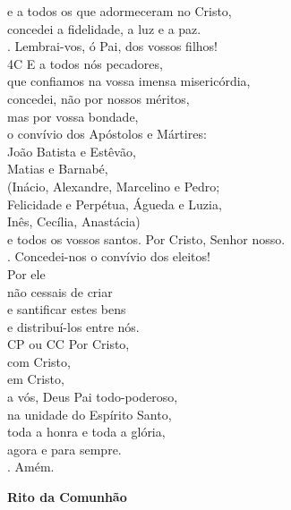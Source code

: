 \documentclass{book}
\begin{document}
\begin{flushleft}
    e a todos os que adormeceram no Cristo, \\
    concedei a fidelidade, a luz e a paz.
    \vspace{.1cm} \\
    {\color{red} \Rbar.} Lembrai-vos, ó Pai, dos vossos filhos!
    \vspace{.1cm} \\
    {\color{red}4C} E a todos nós pecadores, \\
    que confiamos na vossa imensa misericórdia, \\
    concedei, não por nossos méritos, \\
    mas por vossa bondade, \\
    o convívio dos Apóstolos e Mártires: \\
    João Batista e Estêvão, \\
    Matias e Barnabé, \\
    {\color{red}(}Inácio, Alexandre, Marcelino e Pedro; \\
    Felicidade e Perpétua, Águeda e Luzia, \\
    Inês, Cecília, Anastácia{\color{red})} \\
    e todos os vossos santos.
    Por Cristo, Senhor nosso.
    \vspace{.1cm} \\
    {\color{red} \Rbar.} Concedei-nos o convívio dos eleitos!
    \vspace{.1cm} \\
    Por ele \\
    não cessais de criar \\
    e santificar estes bens \\
    e distribuí-los entre nós.
    \vspace{.1cm} \\
    {\color{red}CP ou CC} Por Cristo, \\
    com Cristo, \\
    em Cristo, \\
    a vós, Deus Pai todo-poderoso, \\
    na unidade do Espírito Santo, \\
    toda a honra e toda a glória, \\
    agora e para sempre.
    \vspace{.1cm} \\
    {\color{red} \Rbar.} Amém.
    \newpage
\end{flushleft}

\begin{center}

    \textbf{Rito da Comunhão}

\end{center}
\end{document}
